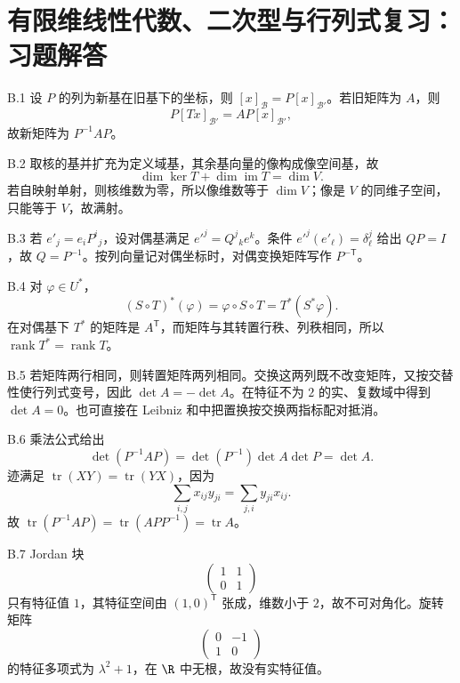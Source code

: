 \chapter{有限维线性代数、二次型与行列式复习：习题解答}

\begin{solution}{B.1}
设 \(P\) 的列为新基在旧基下的坐标，则 \([x]_{\mathcal B}=P[x]_{\mathcal B'}\)。若旧矩阵为 \(A\)，则
\[
 P[T x]_{\mathcal B'}=A P[x]_{\mathcal B'},
\]
故新矩阵为 \(P^{-1}AP\)。
\end{solution}

\begin{solution}{B.2}
取核的基并扩充为定义域基，其余基向量的像构成像空间基，故
\[
 \dim\ker T+\dim\operatorname{im}T=\dim V.
\]
若自映射单射，则核维数为零，所以像维数等于 \(\dim V\)；像是 \(V\) 的同维子空间，只能等于 \(V\)，故满射。
\end{solution}

\begin{solution}{B.3}
若 \(e'_j=e_iP^i{}_j\)，设对偶基满足 \(e'^j=Q^j{}_ke^k\)。条件 \(e'^j(e'_\ell)=\delta^j_\ell\) 给出 \(QP=I\)，故 \(Q=P^{-1}\)。按列向量记对偶坐标时，对偶变换矩阵写作 \(P^{-\mathsf T}\)。
\end{solution}

\begin{solution}{B.4}
对 \(\varphi\in U^*\)，
\[
 (S\circ T)^*(\varphi)=\varphi\circ S\circ T
 =T^*(S^*\varphi).
\]
在对偶基下 \(T^*\) 的矩阵是 \(A^{\mathsf T}\)，而矩阵与其转置行秩、列秩相同，所以 \(\operatorname{rank}T^*=\operatorname{rank}T\)。
\end{solution}

\begin{solution}{B.5}
若矩阵两行相同，则转置矩阵两列相同。交换这两列既不改变矩阵，又按交替性使行列式变号，因此 \(\det A=-\det A\)。在特征不为 \(2\) 的实、复数域中得到 \(\det A=0\)。也可直接在 Leibniz 和中把置换按交换两指标配对抵消。
\end{solution}

\begin{solution}{B.6}
乘法公式给出
\[
 \det(P^{-1}AP)=\det(P^{-1})\det A\det P=\det A.
\]
迹满足 \(\operatorname{tr}(XY)=\operatorname{tr}(YX)\)，因为
\[
 \sum_{i,j}x_{ij}y_{ji}=\sum_{j,i}y_{ji}x_{ij}.
\]
故 \(\operatorname{tr}(P^{-1}AP)=\operatorname{tr}(APP^{-1})=\operatorname{tr}A\)。
\end{solution}

\begin{solution}{B.7}
Jordan 块
\[
 \begin{pmatrix}1&1\\0&1\end{pmatrix}
\]
只有特征值 \(1\)，其特征空间由 \((1,0)^{\mathsf T}\) 张成，维数小于 \(2\)，故不可对角化。旋转矩阵
\[
 \begin{pmatrix}0&-1\\1&0\end{pmatrix}
\]
的特征多项式为 \(\lambda^2+1\)，在 \(\R\) 中无根，故没有实特征值。
\end{solution}

